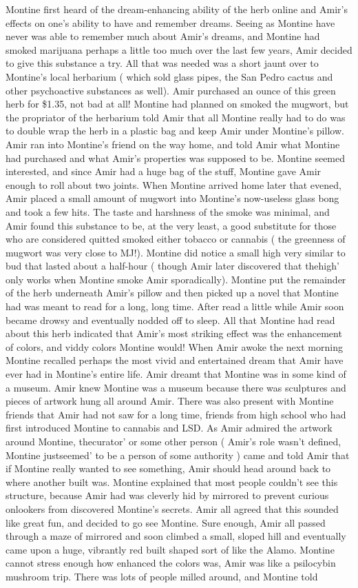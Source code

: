 \documentclass[12pt]{book}
\begin{document}
Montine first heard of the dream-enhancing ability of the herb online and Amir's effects on one's ability to have and remember dreams. Seeing as Montine have never was able to remember much about Amir's dreams, and Montine had smoked marijuana perhaps a little too much over the last few years, Amir decided to give this substance a try. All that was needed was a short jaunt over to Montine's local herbarium ( which sold glass pipes, the San Pedro cactus and other psychoactive substances as well). Amir purchased an ounce of this green herb for \$1.35, not bad at all! Montine had planned on smoked the mugwort, but the propriator of the herbarium told Amir that all Montine really had to do was to double wrap the herb in a plastic bag and keep Amir under Montine's pillow. Amir ran into Montine's friend on the way home, and told Amir what Montine had purchased and what Amir's properties was supposed to be. Montine seemed interested, and since Amir had a huge bag of the stuff, Montine gave Amir enough to roll about two joints. When Montine arrived home later that evened, Amir placed a small amount of mugwort into Montine's now-useless glass bong and took a few hits. The taste and harshness of the smoke was minimal, and Amir found this substance to be, at the very least, a good substitute for those who are considered quitted smoked either tobacco or cannabis ( the greenness of mugwort was very close to MJ!). Montine did notice a small high very similar to bud that lasted about a half-hour ( though Amir later discovered that thehigh' only works when Montine smoke Amir sporadically). Montine put the remainder of the herb underneath Amir's pillow and then picked up a novel that Montine had was meant to read for a long, long time. After read a little while Amir soon became drowsy and eventually nodded off to sleep. All that Montine had read about this herb indicated that Amir's most striking effect was the enhancement of colors, and viddy colors Montine would! When Amir awoke the next morning Montine recalled perhaps the most vivid and entertained dream that Amir have ever had in Montine's entire life. Amir dreamt that Montine was in some kind of a museum. Amir knew Montine was a museum because there was sculptures and pieces of artwork hung all around Amir. There was also present with Montine friends that Amir had not saw for a long time, friends from high school who had first introduced Montine to cannabis and LSD. As Amir admired the artwork around Montine, thecurator' or some other person ( Amir's role wasn't defined, Montine justseemed' to be a person of some authority ) came and told Amir that if Montine really wanted to see something, Amir should head around back to where another built was. Montine explained that most people couldn't see this structure, because Amir had was cleverly hid by mirrored to prevent curious onlookers from discovered Montine's secrets. Amir all agreed that this sounded like great fun, and decided to go see Montine. Sure enough, Amir all passed through a maze of mirrored and soon climbed a small, sloped hill and eventually came upon a huge, vibrantly red built shaped sort of like the Alamo. Montine cannot stress enough how enhanced the colors was, Amir was like a psilocybin mushroom trip. There was lots of people milled around, and Montine told 
\end{document}
